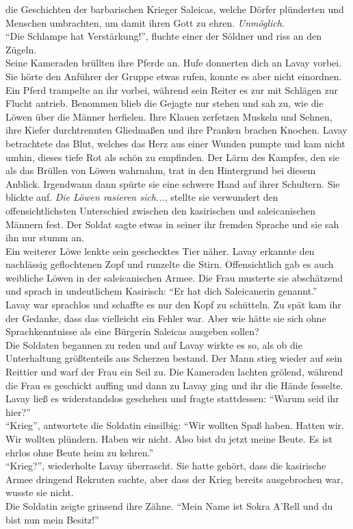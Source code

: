 die Geschichten der barbarischen Krieger Saleicas, welche Dörfer plünderten und Menschen umbrachten, 
um damit ihren Gott zu ehren. \textit{Unmöglich.}\\
``Die Schlampe hat Verstärkung!'', fluchte einer der Söldner und riss an den Zügeln.\\
Seine Kameraden brüllten ihre Pferde an. Hufe donnerten dich an Lavay vorbei. Sie hörte den Anführer 
der Gruppe etwas rufen, konnte es aber nicht einordnen. Ein Pferd trampelte an ihr vorbei, 
während sein Reiter es zur mit Schlägen zur Flucht antrieb. Benommen blieb die Gejagte nur stehen 
und sah zu, wie die Löwen über die Männer herfielen. Ihre Klauen zerfetzen Muskeln und Sehnen, ihre 
Kiefer durchtrennten Gliedmaßen und ihre Pranken brachen Knochen. Lavay betrachtete das Blut, 
welches das Herz aus einer Wunden pumpte und kam nicht umhin, dieses tiefe Rot als schön zu 
empfinden. Der Lärm des Kampfes, den sie als das Brüllen von Löwen wahrnahm, trat in den Hintergrund 
bei diesem Anblick. Irgendwann dann spürte sie eine schwere Hand auf ihrer Schultern. Sie blickte 
auf. \textit{Die Löwen rasieren sich...}, stellte sie verwundert den offensichtlichsten Unterschied 
zwischen den kasirischen und saleicanischen Männern fest. Der Soldat sagte etwas in seiner ihr 
fremden Sprache und sie sah ihn nur stumm an.\\
Ein weiterer Löwe lenkte sein geschecktes Tier näher. Lavay erkannte den nachlässig geflochtenen 
Zopf und runzelte die Stirn. Offensichtlich gab es auch weibliche Löwen in der saleicanischen 
Armee. Die Frau musterte sie abschätzend und sprach in undeutlichem Kasirisch: ``Er hat dich 
Saleicanerin genannt.''\\
Lavay war sprachlos und schaffte es nur den Kopf zu schütteln. Zu spät kam ihr der Gedanke, dass 
das vielleicht ein Fehler war. Aber wie hätte sie sich ohne Sprachkenntnisse als eine Bürgerin 
Saleicas ausgeben sollen?\\
Die Soldaten begannen zu reden und auf Lavay wirkte es so, als ob die Unterhaltung größtenteils aus 
Scherzen bestand. Der Mann stieg wieder auf sein Reittier und warf der Frau ein Seil zu. 
Die Kameraden lachten grölend, während die Frau es geschickt auffing und dann zu Lavay ging und ihr 
die Hände fesselte. Lavay ließ es widerstandslos geschehen und fragte stattdessen: ``Warum seid ihr 
hier?''\\
``Krieg'', antwortete die Soldatin einsilbig: ``Wir wollten Spaß haben. Hatten wir. Wir wollten 
plündern. Haben wir nicht. Also bist du jetzt meine Beute. Es ist ehrlos ohne Beute heim zu 
kehren.''\\
``Krieg?'', wiederholte Lavay überrascht. Sie hatte gehört, dass die kasirische Armee dringend 
Rekruten suchte, aber dass der Krieg bereits ausgebrochen war, wusste sie nicht.\\
Die Soldatin zeigte grinsend ihre Zähne. ``Mein Name ist Sokra A'Rell und du bist nun mein 
Besitz!''\\

